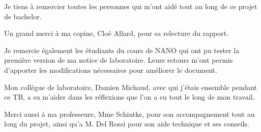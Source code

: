 Je tiens à remercier toutes les personnes qui m'ont aidé tout au long de ce projet de bachelor.

Un grand merci à ma copine, Cloé Allard, pour sa relecture du rapport.

Je remercie également les étudiants du cours de NANO qui ont pu tester la première version de ma notice de laboratoire. Leurs retours m'ont permis d'apporter les modifications nécessaires pour améliorer le document.

Mon collègue de laboratoire, Damien Michaud, avec qui j'étais ensemble pendant ce TB, a su m'aider dans les réflexions que l'on a eu tout le long de mon travail.

Merci aussi à ma professeure, Mme Schintke, pour son accompagnement tout au long du projet, ainsi qu'a M. Del Rossi pour son aide technique et ses conseils.